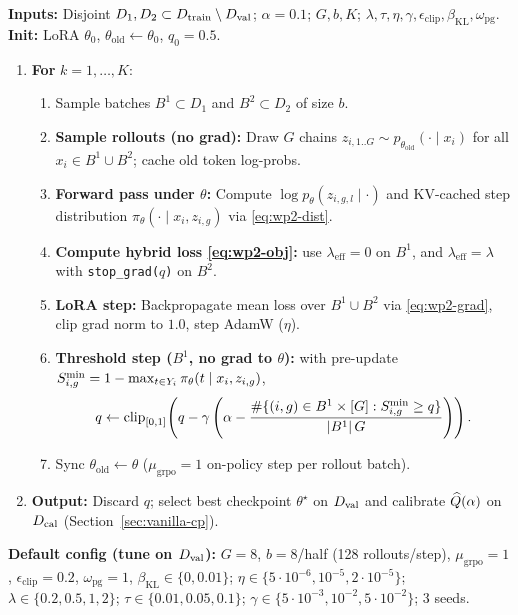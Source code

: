 \documentclass[10pt,a4paper]{article}
\begin{document}
\begin{tcolorbox}[algbox,title={Algorithm 1 \textperiodcentered\ Hybrid Modified GRPO + DPSM for Distributional LRM}]
\small
\textbf{Inputs:} Disjoint $D_1,D_2\subset D_{\mathrm{train}}\setminus D_{\mathrm{val}}$; $\alpha=0.1$; $G, b, K$; $\lambda, \tau, \eta, \gamma, \epsilon_{\mathrm{clip}}, \beta_{\mathrm{KL}}, \omega_{\mathrm{pg}}$. \quad \textbf{Init:} LoRA $\theta_0$, $\theta_{\mathrm{old}}\leftarrow\theta_0$, $q_0=0.5$.
\begin{enumerate}[leftmargin=1.4em,itemsep=2pt]
\item \textbf{For} $k=1,\dots,K$:
  \begin{enumerate}[label=\arabic{enumi}.\arabic*.,leftmargin=1.6em,itemsep=1.5pt]
  \item Sample batches $B^1\subset D_1$ and $B^2\subset D_2$ of size $b$.
  \item \textbf{Sample rollouts (no grad):} Draw $G$ chains $z_{i,1..G}\sim p_{\theta_{\mathrm{old}}}(\cdot\mid x_i)$ for all $x_i\in B^1\cup B^2$; cache old token log-probs.
  \item \textbf{Forward pass under $\theta$:} Compute $\log p_\theta(z_{i,g,l}\mid\cdot)$ and KV-cached step distribution $\pi_\theta(\cdot\mid x_i,z_{i,g})$ via \eqref{eq:wp2-dist}.
  \item \textbf{Compute hybrid loss \eqref{eq:wp2-obj}:} use $\lambda_{\mathrm{eff}}=0$ on $B^1$, and $\lambda_{\mathrm{eff}}=\lambda$ with \texttt{stop\_grad($q$)} on $B^2$.
  \item \textbf{LoRA step:} Backpropagate mean loss over $B^1\cup B^2$ via \eqref{eq:wp2-grad}, clip grad norm to $1.0$, step AdamW ($\eta$).
  \item \textbf{Threshold step ($B^1$, no grad to $\theta$):} with pre-update $S^{\min}_{i,g}=1-\max_{t\in Y_i}\pi_\theta(t\mid x_i,z_{i,g})$,
  \[
  q \leftarrow \mathrm{clip}_{[0,1]}\!\left(q - \gamma\left(\alpha - \frac{\#\{(i,g)\in B^1\times[G] : S^{\min}_{i,g}\ge q\}}{|B^1|\,G}\right)\right).
  \]
  \item Sync $\theta_{\mathrm{old}}\leftarrow\theta$ ($\mu_{\mathrm{grpo}}=1$ on-policy step per rollout batch).
  \end{enumerate}
\item \textbf{Output:} Discard $q$; select best checkpoint $\theta^\star$ on $D_{\mathrm{val}}$ and calibrate $\widehat Q(\alpha)$ on $D_{\mathrm{cal}}$ (Section~\ref{sec:vanilla-cp}).
\end{enumerate}
\end{tcolorbox}

\textbf{Default config (tune on $D_{\mathrm{val}}$):} $G=8$, $b=8$/half (128 rollouts/step), $\mu_{\mathrm{grpo}}=1$, $\epsilon_{\mathrm{clip}}=0.2$, $\omega_{\mathrm{pg}}=1$, $\beta_{\mathrm{KL}}\in\{0,0.01\}$; $\eta\in\{5\!\cdot\!10^{-6},10^{-5},2\!\cdot\!10^{-5}\}$; $\lambda\in\{0.2,0.5,1,2\}$; $\tau\in\{0.01,0.05,0.1\}$; $\gamma\in\{5\!\cdot\!10^{-3},10^{-2},5\!\cdot\!10^{-2}\}$; 3 seeds.
\end{document}
